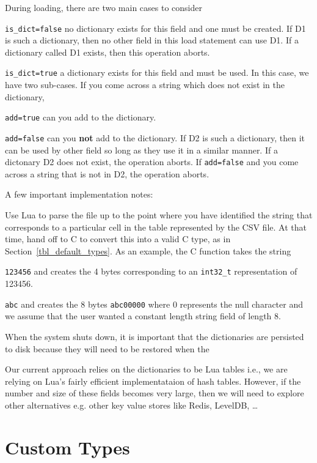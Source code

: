 \documentclass[letterpaper]{article}
\begin{document}
During loading, there are two main cases to consider
\be
\item \verb+is_dict=false+ no dictionary exists for this field and one must be created. If D1 is such
  a dictionary, then no other field in this load statement can use D1. If a
  dictionary called D1 exists, then this operation aborts.
\item \verb+is_dict=true+ a dictionary exists for this field and must be used. In this case, we have
  two sub-cases.  If you come across a string which does not exist in the dictionary, 
  \be
\item \verb+add=true+ can you add to the dictionary. 
\item \verb+add=false+ can you {\bf not} add to the dictionary. 
  \ee
  If D2 is such a dictionary, then it can be used by other field so long as they
  use it in a similar manner. If a dictonary D2 does not exist, the operation
  aborts. If \verb+add=false+ and you come across a string that is not in D2,
  the operation aborts.
  \ee

A few important implementation notes:
\be
\item Use Lua to parse the file up to the point where you have identified the
  string that corresponds to a particular cell in the table represented by the
  CSV file. At that time, hand off to C to convert this into a valid C type, as
  in Section~\ref{tbl_default_types}. As an example, the C function takes the
  string 
  \be
\item \verb+123456+ and creates the 4 bytes corresponding to an
  \verb+int32_t+ representation of 123456.
\item \verb+abc+ and creates the 8 bytes \verb+abc00000+ where 0 represents the
  null character and we assume that the user wanted a constant length string
  field of length 8.
  \ee


\item 
When the system shuts down, it is important that the dictionaries are persisted
to disk because they will need to be restored when the 
\item Our current approach relies on the dictionaries to be Lua tables i.e., we
  are relying on Lua's fairly efficient implementataion of hash tables. However,
  if the number and size of these fields becomes very large, then we will need
  to explore other alternatives e.g. other key value stores like Redis, LevelDB,
  \ldots
  \ee

\section{Custom Types}
\label{custom_types}
\end{document}
